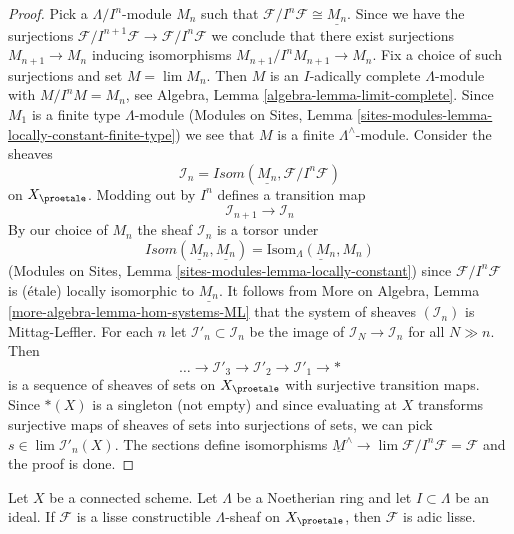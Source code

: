 \begin{proof}
Pick a $\Lambda/I^n$-module $M_n$ such that
$\mathcal{F}/I^n\mathcal{F} \cong \underline{M_n}$.
Since we have the surjections
$\mathcal{F}/I^{n + 1}\mathcal{F} \to \mathcal{F}/I^n\mathcal{F}$
we conclude that there
exist surjections $M_{n + 1} \to M_n$ inducing isomorphisms
$M_{n + 1}/I^nM_{n + 1} \to M_n$. Fix a choice of such surjections
and set $M = \lim M_n$. Then $M$ is an $I$-adically complete
$\Lambda$-module with $M/I^nM = M_n$, see
Algebra, Lemma \ref{algebra-lemma-limit-complete}.
Since $M_1$ is a finite type $\Lambda$-module
(Modules on Sites, Lemma
\ref{sites-modules-lemma-locally-constant-finite-type})
we see that $M$ is a finite $\Lambda^\wedge$-module.
Consider the sheaves
$$
\mathcal{I}_n = \mathit{Isom}(\underline{M_n}, \mathcal{F}/I^n\mathcal{F})
$$
on $X_\proetale$. Modding out by $I^n$ defines a transition map
$$
\mathcal{I}_{n + 1} \longrightarrow \mathcal{I}_n
$$
By our choice of $M_n$ the sheaf $\mathcal{I}_n$ is a torsor under
$$
\mathit{Isom}(\underline{M_n}, \underline{M_n}) =
\underline{\text{Isom}_\Lambda(M_n, M_n)}
$$
(Modules on Sites, Lemma \ref{sites-modules-lemma-locally-constant})
since $\mathcal{F}/I^n\mathcal{F}$ is (\'etale) locally isomorphic
to $\underline{M_n}$. It follows from
More on Algebra, Lemma \ref{more-algebra-lemma-hom-systems-ML}
that the system of sheaves $(\mathcal{I}_n)$ is Mittag-Leffler.
For each $n$ let $\mathcal{I}'_n \subset \mathcal{I}_n$ be the
image of $\mathcal{I}_N \to \mathcal{I}_n$ for all $N \gg n$.
Then
$$
\ldots \to \mathcal{I}'_3 \to \mathcal{I}'_2 \to \mathcal{I}'_1 \to *
$$
is a sequence of sheaves of sets on $X_\proetale$ with surjective
transition maps. Since $*(X)$ is a singleton (not empty)
and since evaluating at $X$ transforms surjective maps of sheaves of sets
into surjections of sets, we can pick
$s \in \lim \mathcal{I}'_n(X)$. The sections define isomorphisms
$\underline{M}^\wedge \to \lim \mathcal{F}/I^n\mathcal{F} = \mathcal{F}$
and the proof is done.
\end{proof}

\begin{lemma}
\label{lemma-connected-lisse}
Let $X$ be a connected scheme. Let $\Lambda$ be a Noetherian ring and let
$I \subset \Lambda$ be an ideal. If $\mathcal{F}$ is a lisse
constructible $\Lambda$-sheaf on $X_\proetale$, then $\mathcal{F}$
is adic lisse.
\end{lemma}


